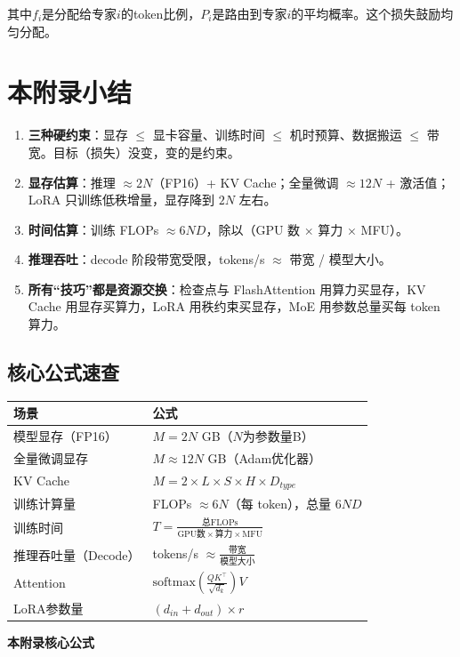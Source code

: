 其中$f_i$是分配给专家$i$的token比例，$P_i$是路由到专家$i$的平均概率。这个损失鼓励均匀分配。

\section*{本附录小结}

\begin{enumerate}
    \item \textbf{三种硬约束}：显存 $\le$ 显卡容量、训练时间 $\le$ 机时预算、数据搬运 $\le$ 带宽。目标（损失）没变，变的是约束。
    \item \textbf{显存估算}：推理 $\approx 2N$（FP16）+ KV Cache；全量微调 $\approx 12N$ + 激活值；LoRA 只训练低秩增量，显存降到 $2N$ 左右。
    \item \textbf{时间估算}：训练 FLOPs $\approx 6ND$，除以（GPU 数 $\times$ 算力 $\times$ MFU）。
    \item \textbf{推理吞吐}：decode 阶段带宽受限，tokens/s $\approx$ 带宽 / 模型大小。
    \item \textbf{所有“技巧”都是资源交换}：检查点与 FlashAttention 用算力买显存，KV Cache 用显存买算力，LoRA 用秩约束买显存，MoE 用参数总量买每 token 算力。
\end{enumerate}

\subsection*{核心公式速查}

\begin{center}

\small
\renewcommand{\arraystretch}{1.5}
\begin{tabular}{l|l}
\toprule
\textbf{场景} & \textbf{公式} \\
\midrule
模型显存（FP16） & $M = 2N$ GB（$N$为参数量B） \\
全量微调显存 & $M \approx 12N$ GB（Adam优化器） \\
KV Cache & $M = 2 \times L \times S \times H \times D_{type}$ \\
\midrule
训练计算量 & FLOPs $\approx 6N$（每 token），总量 $6ND$ \\
训练时间 & $T = \frac{\text{总FLOPs}}{\text{GPU数} \times \text{算力} \times \text{MFU}}$ \\
推理吞吐量（Decode） & tokens/s $\approx \frac{\text{带宽}}{\text{模型大小}}$ \\
\midrule
Attention & $\text{softmax}\left(\frac{QK^\top}{\sqrt{d_k}}\right)V$ \\
LoRA参数量 & $(d_{in} + d_{out}) \times r$ \\
\bottomrule
\end{tabular}
\par\medskip\noindent\textbf{本附录核心公式}\par
\end{center}

